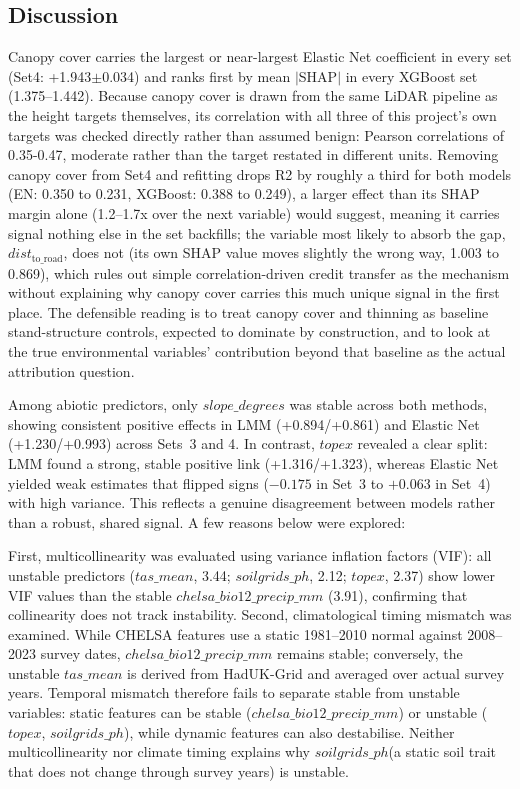 \documentclass[logo,msc,ai]{infthesis}           %
\begin{document}
\subsection{Discussion}
Canopy cover carries the largest or near-largest Elastic Net coefficient in every set (Set4: +1.943$\pm$0.034) and ranks first by mean $|$SHAP$|$ in every XGBoost set (1.375--1.442). Because canopy cover is drawn from the same LiDAR pipeline as the height targets themselves, its correlation with all three of this project's own targets was checked directly rather than assumed benign: Pearson correlations of 0.35-0.47, moderate rather than the target restated in different units. Removing canopy cover from Set4 and refitting drops R2 by roughly a third for both models (EN: 0.350 to 0.231, XGBoost: 0.388 to 0.249), a larger effect than its SHAP margin alone (1.2--1.7x over the next variable) would suggest, meaning it carries signal nothing else in the set backfills; the variable most likely to absorb the gap, $\mathit{dist}_{\text{to\_road}}$, does not (its own SHAP value moves slightly the wrong way, 1.003 to 0.869), which rules out simple correlation-driven credit transfer as the mechanism without explaining why canopy cover carries this much unique signal in the first place. The defensible reading is to treat canopy cover and thinning as baseline stand-structure controls, expected to dominate by construction, and to look at the true environmental variables' contribution beyond that baseline as the actual attribution question. 

Among abiotic predictors, only $\mathit{slope\_degrees}$ was stable across both methods, showing consistent positive effects in LMM (+0.894/+0.861) and Elastic Net (+1.230/+0.993) across Sets~3 and 4. In contrast, $\mathit{topex}$ revealed a clear split: LMM found a strong, stable positive link (+1.316/+1.323), whereas Elastic Net yielded weak estimates that flipped signs ($-0.175$ in Set~3 to $+0.063$ in Set~4) with high variance. This reflects a genuine disagreement between models rather than a robust, shared signal. A few reasons below were explored: 

First, multicollinearity was evaluated using variance inflation factors (VIF): all unstable predictors ($\mathit{tas\_mean}$, 3.44; $\mathit{soilgrids\_ph}$, 2.12; $\mathit{topex}$, 2.37) show lower VIF values than the stable $\mathit{chelsa\_bio12\_precip\_mm}$ (3.91), confirming that collinearity does not track instability. 
Second, climatological timing mismatch was examined. While CHELSA features use a static 1981--2010 normal against 2008--2023 survey dates, $\mathit{chelsa\_bio12\_precip\_mm}$ remains stable; conversely, the unstable $\mathit{tas\_mean}$ is derived from HadUK-Grid and averaged over actual survey years. Temporal mismatch therefore fails to separate stable from unstable variables: static features can be stable ($\mathit{chelsa\_bio12\_precip\_mm}$) or unstable ($\mathit{topex}$, $\mathit{soilgrids\_ph}$), while dynamic features can also destabilise. 
Neither multicollinearity nor climate timing explains why $\mathit{soilgrids\_ph}$(a static soil trait that does not change through survey years) is unstable.
\end{document}
